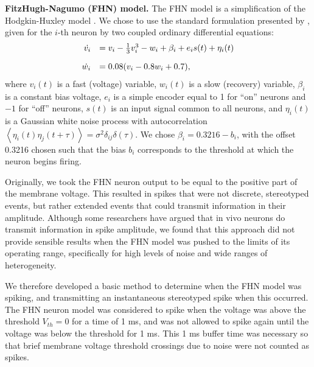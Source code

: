\documentclass[12pt]{article}
\begin{document}
\textbf{FitzHugh-Nagumo (FHN) model.} The FHN model is a simplification of the Hodgkin-Huxley model \citep{FitzHugh1961}. We chose to use the standard formulation presented by \cite{Izhikevich2006}, given for the $i$-th neuron by two coupled ordinary differential equations:
\begin{equation}
  \begin{array}{rl}
    \dot{v_i} & = v_i - \frac{1}{3}v_i^3 - w_i + \beta_i + e_i s(t) + \eta_i(t) \vspace{1em}\\
    \dot{w_i} & = 0.08(v_i - 0.8w_i + 0.7),
  \end{array}
  \label{eqn:fhn}
\end{equation}
where $v_i(t)$ is a fast (voltage) variable, $w_i(t)$ is a slow (recovery) variable, $\beta_i$ is a constant bias voltage, $e_i$ is a simple encoder equal to 1 for ``on'' neurons and $-1$ for ``off'' neurons, $s(t)$ is an input signal common to all neurons, and $\eta_i(t)$ is a Gaussian white noise process with autocorrelation $\left<\eta_i(t)\eta_j(t + \tau)\right> = \sigma^2 \delta_{ij}\delta(\tau)$. We chose $\beta_i = 0.3216 - b_i$, with the offset 0.3216 chosen such that the bias $b_i$ corresponds to the threshold at which the neuron begins firing.

Originally, we took the FHN neuron output to be equal to the positive part of the membrane voltage.
This resulted in spikes that were not discrete, stereotyped events,
but rather extended events that could transmit information in their amplitude.
Although some researchers have argued that in vivo neurons do transmit information in spike amplitude,
we found that this approach did not provide sensible results when the FHN model
was pushed to the limits of its operating range,
specifically for high levels of noise and wide ranges of heterogeneity.

We therefore developed a basic method to determine when the FHN model was spiking,
and transmitting an instantaneous stereotyped spike when this occurred.
The FHN neuron model was considered to spike
when the voltage was above the threshold $V_{th} = 0$ for a time of 1 ms,
and was not allowed to spike again until the voltage was below the threshold for 1 ms.
This 1 ms buffer time was necessary so that brief membrane voltage threshold crossings
due to noise were not counted as spikes.
\end{document}
